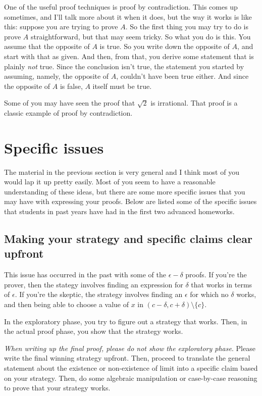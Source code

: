 \documentclass{amsart}
\begin{document}
One of the useful proof techniques is proof by contradiction. This
comes up sometimes, and I'll talk more about it when it does, but the
way it works is like this: suppose you are trying to prove $A$. So the
first thing you may try to do is prove $A$ straightforward, but that
may seem tricky. So what you do is this. You assume that the opposite
of $A$ is true. So you write down the opposite of $A$, and start with
that as given. And then, from that, you derive some statement that is
plainly {\em not} true. Since the conclusion isn't true, the statement
you started by assuming, namely, the opposite of $A$, couldn't have
been true either. And since the opposite of $A$ is false, $A$ itself
must be true.

Some of you may have seen the proof that $\sqrt{2}$ is
irrational. That proof is a classic example of proof by contradiction.

\section{Specific issues}

The material in the previous section is very general and I think most
of you would lap it up pretty easily. Most of you seem to have a
reasonable understanding of these ideas, but there are some more
specific issues that you may have with expressing your proofs. Below
are listed some of the specific issues that students in past years
have had in the first two advanced homeworks.

\subsection{Making your strategy and specific claims clear upfront}

This issue has occurred in the past with some of the $\epsilon-\delta$
proofs. If you're the prover, then the stategy involves finding an
expression for $\delta$ that works in terms of $\epsilon$. If you're
the skeptic, the strategy involves finding an $\epsilon$ for which no
$\delta$ works, and then being able to choose a value of $x$ in $(c -
\delta, c + \delta) \setminus \{ c\}$.

In the exploratory phase, you try to figure out a strategy that
works. Then, in the actual proof phase, you show that the strategy works.

{\em When writing up the final proof, please do not show the
exploratory phase}. Please write the final winning strategy
upfront. Then, proceed to translate the general statement about the
existence or non-existence of limit into a specific claim based on
your strategy. Then, do some algebraic manipulation or case-by-case
reasoning to prove that your strategy works.
\end{document}
